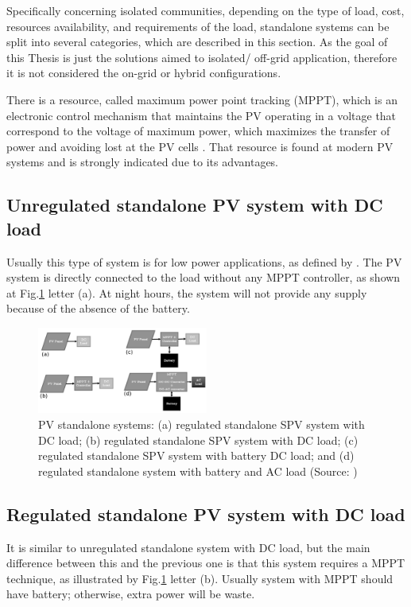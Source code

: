 \documentclass[journal]{IEEEtran}
\begin{document}
Specifically concerning isolated communities, depending on the type of load, cost, resources availability, and requirements of the load, standalone systems can be split into several categories, which are described in this section. As the goal of this Thesis is just the solutions aimed to isolated/ off-grid application, therefore it is not considered the on-grid or hybrid configurations.
 
There is a resource, called maximum power point tracking (MPPT), which is an electronic control mechanism that maintains the PV operating in a voltage that correspond to the voltage of maximum power, which maximizes the transfer of power and avoiding lost at the PV cells \cite{Pinho}. That resource is found at modern PV systems and is strongly indicated due to its advantages.

\subsection{Unregulated standalone PV system with DC load }
Usually this type of system is for low power applications, as defined by \cite{Roy}. The PV system is directly connected to the load without any MPPT controller, as shown at Fig.\ref{fig:standaloneSPV} letter (a). At night hours, the system will not provide any supply because of the absence of the battery. 
 
\begin{figure}[h]
\includegraphics[width=0.5\textwidth]{reg_unreg4.png}
\centering
\caption{PV standalone systems: (a) regulated standalone SPV system with DC load; (b) regulated standalone SPV system with DC load; (c) regulated standalone SPV system with battery DC load; and (d) regulated standalone system with battery and AC load  (Source: \cite{Roy})}
\label{fig:standaloneSPV}
\end{figure}

\subsection{Regulated standalone PV system with DC load}
It is similar to unregulated standalone system with DC load, but the main difference between this and the previous one is that this system requires a MPPT technique, as illustrated by Fig.\ref{fig:standaloneSPV} letter (b). Usually system with MPPT should have battery; otherwise, extra power will be waste.
\end{document}

